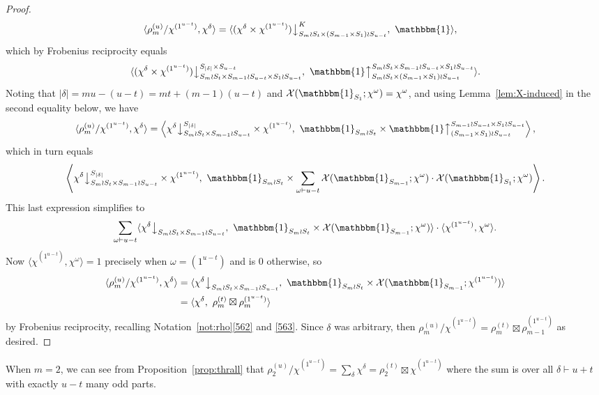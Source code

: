 \documentclass[ALCO, Unicode]{cedram}
\newcommand{\triv}{\mathbbm{1}}
\newcommand{\down}{\big\downarrow}
\newcommand{\up}{\big\uparrow}
\newcommand{\cX}{\mathcal{X}}
\begin{document}
\begin{proof}
	\begin{align*}
		\langle \rho^{(u)}_m/\chi^{(1^{u-t})}, \chi^\delta\rangle &= \langle (\chi^\delta\times\chi^{(1^{u-t})})\down^K_{S_m\wr S_t\times (S_{m-1}\times S_1)\wr S_{u-t}},\ \triv\rangle,
		\end{align*}
which by Frobenius reciprocity equals
		\[\langle (\chi^\delta\times\chi^{(1^{u-t})})\down^{S_{|\delta|}\times S_{u-t}}_{S_m\wr S_t\times S_{m-1}\wr S_{u-t}\times S_1\wr S_{u-t}},\ \triv\up_{S_m\wr S_t\times (S_{m-1}\times S_1)\wr S_{u-t}}^{{S_m\wr S_t\times S_{m-1}\wr S_{u-t}\times S_1\wr S_{u-t}}}\rangle.
	\]
		 Noting that $|\delta|=mu-(u-t)=mt+(m-1)(u-t)$ and $\cX(\triv_{S_1};\chi^\omega)=\chi^\omega$, and using Lemma~\ref{lem:X-induced} in the second equality below, we have
	\begin{align*}
		\langle \rho^{(u)}_m/\chi^{(1^{u-t})}, \chi^\delta\rangle = \left\langle \chi^\delta\down^{S_{|\delta|}}_{S_m\wr S_t\times S_{m-1}\wr S_{u-t}} \times \chi^{(1^{u-t})},\ \triv_{S_m\wr S_t} \times \triv\up_{(S_{m-1}\times S_1)\wr S_{u-t}}^{S_{m-1}\wr S_{u-t}\times S_1\wr S_{u-t}}\right\rangle,
		\end{align*}
which in turn equals
\[
 \left\langle \chi^\delta\down^{S_{|\delta|}}_{S_m\wr S_t\times S_{m-1}\wr S_{u-t}} \times \chi^{(1^{u-t})},\ \triv_{S_m\wr S_t} \times \sum_{\omega\vdash u-t}\cX(\triv_{S_{m-1}}; \chi^\omega)\cdot\cX(\triv_{S_1};\chi^\omega) \right\rangle.
 \]
 This last expression simplifies to
\[
 \sum_{\omega\vdash u-t} \langle \chi^\delta\down_{S_m\wr S_t\times S_{m-1}\wr S_{u-t}},\ \triv_{S_m\wr S_t}\times \cX(\triv_{S_{m-1}};\chi^\omega)\rangle\cdot\langle \chi^{(1^{u-t})},\chi^\omega\rangle.
 \]
Now $\langle \chi^{(1^{u-t})},\chi^\omega\rangle=1$ precisely when $\omega=(1^{u-t})$ and is 0 otherwise, so
	\begin{align*} \langle \rho^{(u)}_m/\chi^{(1^{u-t})}, \chi^\delta\rangle &= \langle \chi^\delta\down_{S_m\wr S_t\times S_{m-1}\wr S_{u-t}},\ \triv_{S_m\wr S_t}\times \cX(\triv_{S_{m-1}};\chi^{(1^{u-t})})\rangle\\ &= \langle \chi^\delta,\ \rho^{(t)}_m\boxtimes \rho^{(1^{u-t})}_m\rangle \end{align*}
	by Frobenius reciprocity, recalling Notation~\ref{not:rho}\ref{562} and \ref{563}.
	Since $\delta$ was arbitrary, then $\rho^{(u)}_m/\chi^{(1^{u-t})} = \rho^{(t)}_m\boxtimes \rho^{(1^{u-t})}_{m-1}$ as desired.
\end{proof}

\begin{remark}
	When $m=2$, we can see from Proposition~\ref{prop:thrall} that $\rho^{(u)}_2/\chi^{(1^{u-t})} = \sum_\delta \chi^\delta = \rho^{(t)}_2\boxtimes\chi^{(1^{u-t})}$ where the sum is over all $\delta\vdash u+t$ with exactly $u-t$ many odd parts.%
\end{remark}
\end{document}
